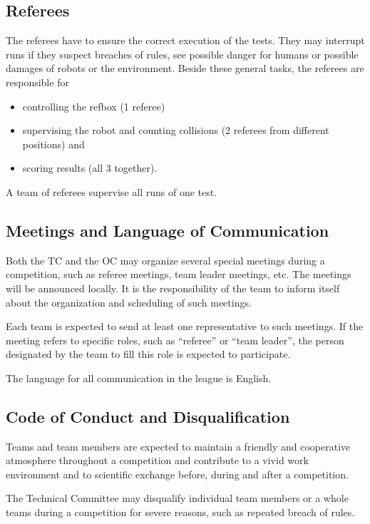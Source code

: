 \subsection{Referees}
The referees have to ensure the correct execution of the tests. They may interrupt runs if they suspect breaches of rules, see possible danger for humans or possible damages of robots or the environment. Beside these general tasks, the referees are responsible for
\begin{itemize}
\item controlling the refbox (1 referee) 
\item supervising the robot and counting collisions (2 referees from different positions) and
\item scoring results (all 3 together).
\end{itemize}
A team of referees supervise all runs of one test. 


\subsection{Meetings and Language of Communication}
Both the TC and the OC may organize several special meetings during a competition, such as referee meetings, team leader meetings, etc. The meetings will be announced locally. It is the responsibility of the team to inform itself about the organization and scheduling of such meetings.  
\par
Each team is expected to send at least one representative to such meetings. If the meeting refers to specific roles, such as “referee” or “team leader”, the person designated by the team to fill this role is expected to participate. 
\par
The language for all communication in the league is English.

\subsection{Code of Conduct and Disqualification}
Teams and team members are expected to maintain a friendly and cooperative atmosphere throughout a competition and contribute to a vivid work environment and to scientific exchange before, during and after a competition.
\par
The Technical Committee may disqualify individual team members or a whole teams during a competition for severe reasons, such as repeated breach of rules. 
